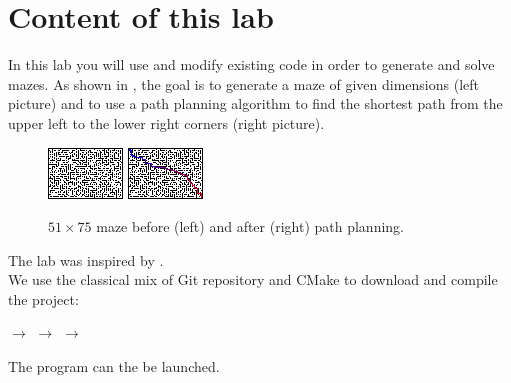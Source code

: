 \documentclass{ecnreport}
\begin{document}


\newcommand{\involves}[1]{
\item {\bf C++ skills:} #1
}

\newcommand{\aitip}[1]{
\item {\bf AI tips:} #1
}

\section{Content of this lab}

In this lab you will use and modify existing code in order to generate and solve mazes. As shown in , the goal is to generate 
a maze of given dimensions (left picture) and to use a path planning algorithm to find the shortest path from the upper left to the lower right corners (right picture).

\begin{figure}[h]\centering
\includegraphics[width=.4\linewidth]{maze} \quad \quad\includegraphics[width=.4\linewidth]{maze_cell}
\caption{$51\times 75$ maze before (left) and after (right) path planning.}
\label{maze2}
\end{figure}

The lab was inspired by .\\

We use the classical mix of Git repository and CMake to download and compile the project:
\begin{center}
  $\rightarrow$  $\rightarrow$  $\rightarrow$ 
\end{center}
The program can the be launched.
\end{document}
